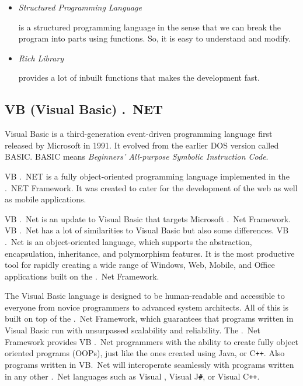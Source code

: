 {\begin{itemize}
	{\cs} is automatic scalable and updateable programming language. For updating our application we delete the old files and update them with new ones.
		
	\item \textit{Structured Programming Language}
	
	{\cs} is a structured programming language in the sense that we can break the program into parts using functions. So, it is easy to understand and modify.
	
	\item \textit{Rich Library}
	
	{\cs} provides a lot of inbuilt functions that makes the development fast.
	
\end{itemize}

\subsection{VB (Visual Basic) .\ NET}

Visual Basic is a third-generation event-driven programming language first released by Microsoft in 1991. It evolved from the earlier {DOS} version called {BASIC}. BASIC means \textit{Beginners' All-purpose Symbolic Instruction Code}. %

VB .\ NET is a fully object-oriented programming language implemented in the .\ NET Framework. It was created to cater for the development of the web as well as mobile applications.

VB .\ Net is an update to Visual Basic that targets Microsoft .\ Net Framework. VB .\ Net has a lot of similarities to Visual Basic but also some differences. VB .\ Net is an object-oriented language, which supports the abstraction, encapsulation, inheritance, and polymorphism features. It is the most productive tool for rapidly creating a wide range of Windows, Web, Mobile, and Office applications built on the .\ Net Framework.

The Visual Basic language is designed to be human-readable and accessible to everyone from novice programmers to advanced system architects. All of this is built on top of the .\ Net Framework, which guarantees that programs written in Visual Basic run with unsurpassed scalability and reliability. The .\ Net Framework provides VB .\ Net programmers with the ability to create fully object oriented programs (OOPs), just like the ones created using Java, {\cs} or C\texttt{++}. Also programs written in VB.\ Net will interoperate seamlessly with programs written in any other .\ Net languages such as Visual {\cs}, Visual J\texttt{\#}, or Visual C\texttt{++}.

}
